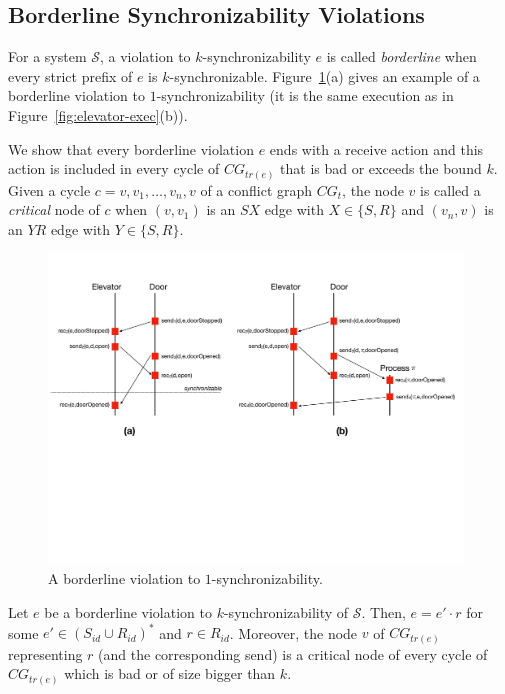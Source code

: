 \subsection{Borderline Synchronizability Violations}\label{ssec:verif1}

For a system $\mathcal{S}$, a violation to $k$-synchronizability $e$ is called \emph{borderline} when every strict prefix of 
$e$ is $k$-synchronizable. Figure~\ref{fig:ex-border-sim}(a) gives an example of a borderline violation to $1$-synchronizability (it is the same execution as in Figure~\ref{fig:elevator-exec}(b)).

We show that every borderline violation $e$ ends with a receive action and this action is included in every cycle of $CG_{tr(e)}$ that is 
bad or exceeds the bound $k$. Given a cycle $c = v,v_1,\ldots,v_n,v$ of a conflict graph $CG_t$, the node $v$ is called a \emph{critical} node of $c$ when $(v,v_1)$ is an $SX$ edge with $X\in \{S,R\}$ 
and $(v_n,v)$ is an $YR$ edge with $Y\in \{S,R\}$.


\begin{figure}[t]
\includegraphics[width=11cm]{Borderline-sim.pdf}
\caption{A borderline violation to $1$-synchronizability.}
\label{fig:ex-border-sim}
\end{figure}

\begin{lemma}
Let $e$ be a borderline violation to $k$-synchronizability of $\mathcal{S}$. Then, $e = e'\cdot r$ for some $e'\in (S_{id}\cup R_{id})^*$ and $r\in R_{id}$.
Moreover, the node $v$ of $CG_{tr(e)}$ representing $r$ (and the corresponding send) is a critical node of every cycle of 
$CG_{tr(e)}$ which is bad or of size bigger than $k$. %
\end{lemma}


